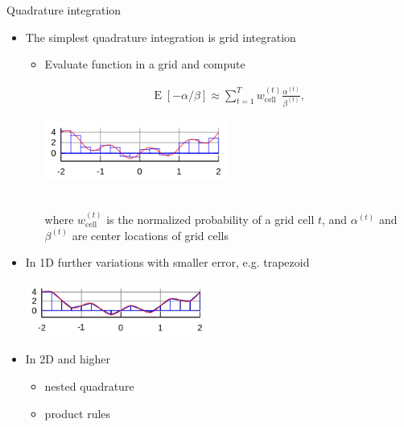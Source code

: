 \documentclass[finnish,english,t]{beamer}
\DeclareMathOperator{\E}{E}
\begin{document}
\begin{frame}
   
  {\Large\color{navyblue} Quadrature integration}

  \begin{itemize}
  \item The simplest quadrature integration is grid integration
    \begin{itemize}
    \item Evaluate function in a grid and compute\\
    \hspace{-1cm}\begin{minipage}{4cm}
    \begin{align*}
      \E[-\alpha/\beta] \approx \sum_{t=1}^{T} w_{\mathrm{cell}}^{(t)} \frac{\alpha^{(t)}}{\beta^{(t)}},
    \end{align*}
  \end{minipage}
  \begin{minipage}{6cm}
  \includegraphics[width=6cm]{Integration_rectangle.png}
\end{minipage}\\
where $w_{\mathrm{cell}}^{(t)}$ is the normalized probability of a grid cell $t$, and $\alpha^{(t)}$ and $\beta^{(t)}$ are center locations of grid cells
\end{itemize}
\item<2-> In 1D further variations with smaller error, e.g. trapezoid
  \begin{center}
    \includegraphics[width=6cm]{Integration_trapezoid.png}
  \end{center}
\item<3-> In 2D and higher
  \begin{itemize}
  \item nested quadrature
  \item product rules
  \end{itemize}
  \end{itemize}
  

\end{frame}
\end{document}
